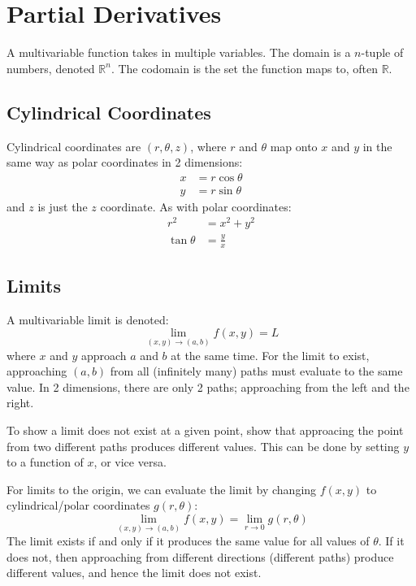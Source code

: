 \documentclass{article}
\begin{document}
\section{Partial Derivatives}

A multivariable function takes in multiple variables. The domain is a $n$-tuple of numbers, denoted $\mathbb R^n$. The codomain is the set the function maps to, often $\mathbb R$.

\subsection{Cylindrical Coordinates}

Cylindrical coordinates are $(r,\theta,z)$, where $r$ and $\theta$ map onto $x$ and $y$ in the same way as polar coordinates in 2 dimensions:
\begin{align*}
	x&=r\cos\theta \\
	y&=r\sin\theta
\end{align*}
and $z$ is just the $z$ coordinate. As with polar coordinates:
\begin{align*}
	r^2&=x^2+y^2 \\
	\tan\theta&=\frac{y}{x}
\end{align*}

\subsection{Limits}

A multivariable limit is denoted:
\begin{equation*}
    \lim_{(x,y)\to(a,b)}f(x,y)=L
\end{equation*}
where $x$ and $y$ approach $a$ and $b$ at the same time. For the limit to exist, approaching $(a,b)$ from all (infinitely many) paths must evaluate to the same value. In 2 dimensions, there are only 2 paths; approaching from the left and the right.

To show a limit does not exist at a given point, show that approacing the point from two different paths produces different values. This can be done by setting $y$ to a function of $x$, or vice versa.

For limits to the origin, we can evaluate the limit by changing $f(x,y)$ to cylindrical/polar coordinates $g(r,\theta)$:
\begin{equation*}
    \lim_{(x,y)\to(a,b)}f(x,y)
	=\lim_{r\to0}g(r,\theta)
\end{equation*}
The limit exists if and only if it produces the same value for all values of $\theta$. If it does not, then approaching from different directions (different paths) produce different values, and hence the limit does not exist.
\end{document}
